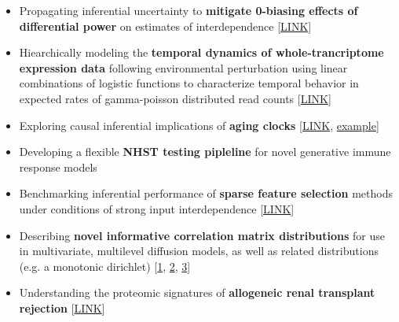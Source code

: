 \documentclass[12pt]{article}
\begin{document}
\begin{itemize}[noitemsep]
\item Propagating inferential uncertainty to \textbf{mitigate 0-biasing effects of differential power} on estimates of interdependence  [\href{https://github.com/NikVetr/minor\_scripts/blob/master/postdoc/propagate\_uncertainty\_correlations.R}{LINK}]

\item Hiearchically modeling the \textbf{temporal dynamics of whole-trancriptome expression data} following environmental perturbation using linear combinations of logistic functions to characterize temporal behavior in expected rates of gamma-poisson distributed read counts [\href{https://github.com/NikVetr/montgomery_lab/blob/61e2ac4b0fea0ee7f5bf31590a40378f0027264a/growth\_and\_decay\_processes.R#L8}{LINK}]

\item Exploring causal inferential implications of \textbf{aging clocks} [\href{https://github.com/NikVetr/montgomery\_lab/blob/61e2ac4b0fea0ee7f5bf31590a40378f0027264a/collider\_effects\_on\_R2.R#L4}{LINK}, \href{https://drive.google.com/file/d/1AQU0YMVoYCEFuIICHGIXGxoXm6dj7HxY/view}{example}]

\item Developing a flexible \textbf{NHST testing pipleline} for novel generative immune response models


\item Benchmarking inferential performance of \textbf{sparse feature selection} methods under conditions of strong input interdependence [\href{https://github.com/NikVetr/minor\_scripts/blob/master/postdoc/sparse\_var\_selection\_test.R}{LINK}]


\item Describing \textbf{novel informative correlation matrix distributions} for use in multivariate,  multilevel diffusion models, as well as related distributions (e.g. a monotonic dirichlet) [\href{https://github.com/NikVetr/dissertation\_work/blob/master/informative\_corrmat\_prior.R}{1},  \href{https://github.com/NikVetr/minor\_scripts/blob/master/postdoc/cmat-eigenconstraints\_Stan.R}{2}, \href{https://github.com/NikVetr/minor\_scripts/blob/master/postdoc/ordered\_dirichlet.r}{3}]

\item Understanding the proteomic signatures of \textbf{allogeneic renal transplant rejection} [\href{https://github.com/NikVetr/minor\_scripts/blob/c8926965b0c6dd9158351cf5836cbc76261f6830/postdoc/renal\_transplant\_censored\_poisson.R}{LINK}]


\end{itemize}
\end{document}
